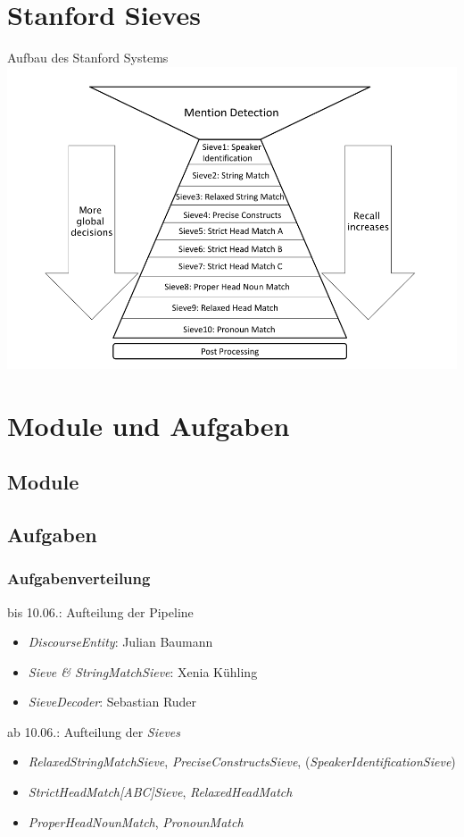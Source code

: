 \documentclass[11pt,a4paper]{beamer}
\begin{document}
\section{Stanford Sieves}
\begin{frame}{Aufbau des Stanford Systems}
\includegraphics[scale=0.29]{stanford.png}
\end{frame}



\section{Module und Aufgaben}

\subsection{Module}

\subsection{Aufgaben}

\begin{frame}
\frametitle{Aufgabenverteilung}

bis 10.06.: Aufteilung der Pipeline 
\begin{itemize}
  \item \textit{DiscourseEntity}: Julian Baumann
  \item \textit{Sieve \& StringMatchSieve}: Xenia Kühling
  \item \textit{SieveDecoder}: Sebastian Ruder
\end{itemize}
ab 10.06.: Aufteilung der \textit{Sieves}
\begin{itemize}
  \item \textit{RelaxedStringMatchSieve}, \textit{PreciseConstructsSieve}, (\textit{SpeakerIdentificationSieve})
  \item \textit{StrictHeadMatch[ABC]Sieve}, \textit{RelaxedHeadMatch}
  \item \textit{ProperHeadNounMatch}, \textit{PronounMatch}
\end{itemize}

\end{frame}
\end{document}
